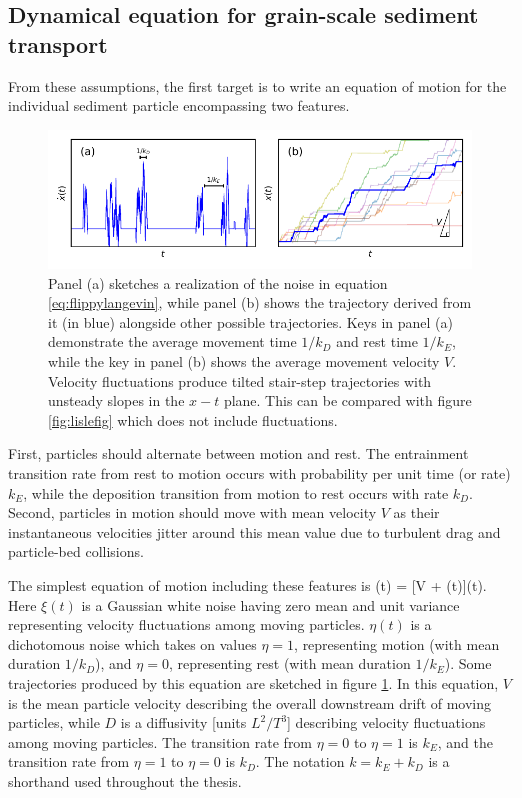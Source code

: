 \subsection{Dynamical equation for grain-scale sediment transport}
From these assumptions, the first target is to write an equation of motion for the individual sediment particle encompassing two features.
\begin{figure}
	\centerline{\includegraphics{./figures/ch2/fig0mod.pdf}}
	\caption{Panel (a) sketches a realization of the noise in equation \ref{eq:flippylangevin}, while panel (b) shows the trajectory derived from it (in blue) alongside other possible trajectories. Keys in panel (a) demonstrate the average movement time $1/k_D$ and rest time $1/k_E$, while the key in panel (b) shows the average movement velocity $V$. Velocity fluctuations produce tilted stair-step trajectories with unsteady slopes in the $x-t$ plane. This can be compared with figure \ref{fig:lislefig} which does not include fluctuations.}
	\label{fig:fluxxy0}
\end{figure}
First, particles should alternate between motion and rest.
The entrainment transition rate from rest to motion occurs with probability per unit time (or rate) $k_E$, while the deposition transition from motion to rest occurs with rate $k_D$.
Second, particles in motion should move with mean velocity $V$ as their instantaneous velocities jitter around this mean value due to turbulent drag and particle-bed collisions.

The simplest equation of motion including these features is
\be {}(t) = [V + \xi(t)]\eta(t).  \label{eq:flippylangevin} \ee
Here $\xi(t)$ is a Gaussian white noise having zero mean and unit variance representing velocity fluctuations among moving particles. $\eta(t)$ is a dichotomous noise which takes on values $\eta = 1$, representing motion (with mean duration $1/k_D$), and $\eta=0$, representing rest (with mean duration $1/k_E$).
Some trajectories produced by this equation are sketched in figure \ref{fig:fluxxy0}. In this equation, $V$ is the mean particle velocity describing the overall downstream drift of moving particles, while $D$ is a diffusivity [units $L^2/T^3$] describing velocity fluctuations among moving particles.
The transition rate from $\eta=0$ to $\eta = 1$ is $k_E$, and the transition rate from $\eta=1$ to $\eta= 0$ is $k_D$. The notation $k=k_E+k_D$ is a shorthand used throughout the thesis.

